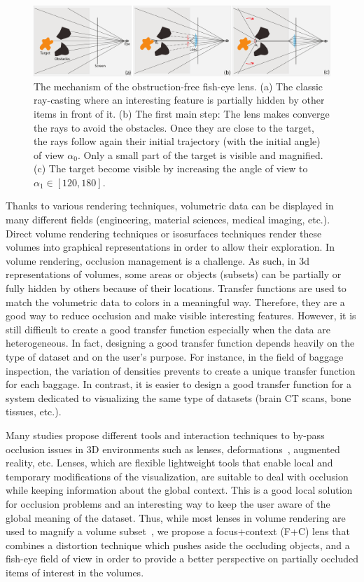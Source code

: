 \begin{figure} 
\includegraphics [width=\textwidth]{images/principle.pdf} 
\caption{The mechanism of the obstruction-free fish-eye lens. (a) The classic ray-casting where an interesting feature is partially hidden by other items in front of it. (b) The first main step: The lens makes converge the rays to avoid the obstacles. Once they are close to the target, the rays follow again their initial trajectory (with the initial angle) of view $\alpha_0$. Only a small part of the target is visible and magnified. (c) The target become visible by increasing the angle of view to $\alpha_1 \in \left[120,180\right]$.   }
\label{f:fisheye}
\end{figure}


Thanks to various rendering techniques, volumetric data can be displayed in many different fields (engineering, material sciences, medical imaging, etc.). Direct volume rendering techniques or isosurfaces techniques render these volumes into graphical representations in order to allow their exploration. In volume rendering, occlusion management is a challenge. As such, in 3d representations of volumes, some areas or objects (subsets) can be partially or fully hidden by others because of their locations. Transfer functions are used to match the volumetric data to colors in a meaningful way. Therefore, they are a good way to reduce occlusion and make visible interesting features.  However, it is still difficult to create a good transfer function especially when the data are heterogeneous. In fact, designing a good transfer function depends heavily on the type of dataset and on the user's purpose. For instance, in the field of baggage inspection, the variation of densities prevents to create a unique transfer function for each baggage. In contrast, it is easier to design a good transfer function for a system dedicated to visualizing the same type of datasets (brain CT scans, bone tissues, etc.). 

Many studies propose different tools and interaction techniques to by-pass occlusion issues in 3D environments such as lenses, deformations~\cite{595268}, augmented reality, etc. Lenses, which are flexible lightweight tools that enable local and temporary modifications of the visualization, are suitable to deal with occlusion while keeping information about the global context. This is a good local solution for occlusion problems and an interesting way to keep the user aware of the global meaning of the dataset. Thus, while most lenses in volume rendering are used to magnify a volume subset~\cite{CGF:CGF12871}, we propose a focus+context (F+C) lens that combines a distortion technique which pushes aside the occluding objects, and a  fish-eye field of view in order to provide a better perspective on partially occluded items of interest in the volumes.  


